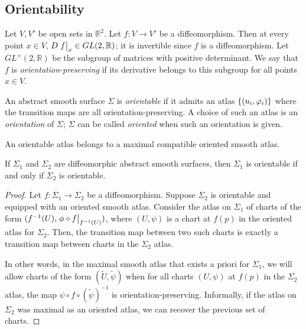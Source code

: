 \subsection{Orientability}
\begin{definition}
	Let \( V, V' \) be open sets in \( \mathbb R^2 \).
	Let \( f \colon V \to V' \) be a diffeomorphism.
	Then at every point \( x \in V \), \( D\eval{f}_x \in GL(2,\mathbb R) \); it is invertible since \( f \) is a diffeomorphism.
	Let \( GL^+(2,\mathbb R) \) be the subgroup of matrices with positive determinant.
	We say that \( f \) is \textit{orientation-preserving} if its derivative belongs to this subgroup for all points \( x \in V \).
\end{definition}
\begin{definition}
	An abstract smooth surface \( \Sigma \) is \textit{orientable} if it admits an atlas \( \qty{(u_i, \varphi_i)} \) where the transition maps are all orientation-preserving.
	A choice of such an atlas is an \textit{orientation} of \( \Sigma \); \( \Sigma \) can be called \textit{oriented} when such an orientation is given.
\end{definition}
\begin{remark}
	An orientable atlas belongs to a maximal compatible oriented smooth atlas.
\end{remark}
\begin{lemma}
	If \( \Sigma_1 \) and \( \Sigma_2 \) are diffeomorphic abstract smooth surfaces, then \( \Sigma_1 \) is orientable if and only if \( \Sigma_2 \) is orientable.
\end{lemma}
\begin{proof}
	Let \( f \colon \Sigma_1 \to \Sigma_2 \) be a diffeomorphism.
	Suppose \( \Sigma_2 \) is orientable and equipped with an oriented smooth atlas.
	Consider the atlas on \( \Sigma_1 \) of charts of the form \( (f^{-1}(U), \eval{\phi \circ f}_{f^{-1}(U)}) \), where \( (U, \psi) \) is a chart at \( f(p) \) in the oriented atlas for \( \Sigma_2 \).
	Then, the transition map between two such charts is exactly a transition map between charts in the \( \Sigma_2 \) atlas.

	In other words, in the maximal smooth atlas that exists a priori for \( \Sigma_1 \), we will allow charts of the form \( (\widetilde U, \widetilde \psi) \) when for all charts \( (U, \psi) \) at \( f(p) \) in the \( \Sigma_2 \) atlas, the map \( \psi \circ f \circ (\widetilde \psi)^{-1} \) is orientation-preserving.
	Informally, if the atlas on \( \Sigma_2 \) was maximal as an oriented atlas, we can recover the previous set of charts.
\end{proof}
